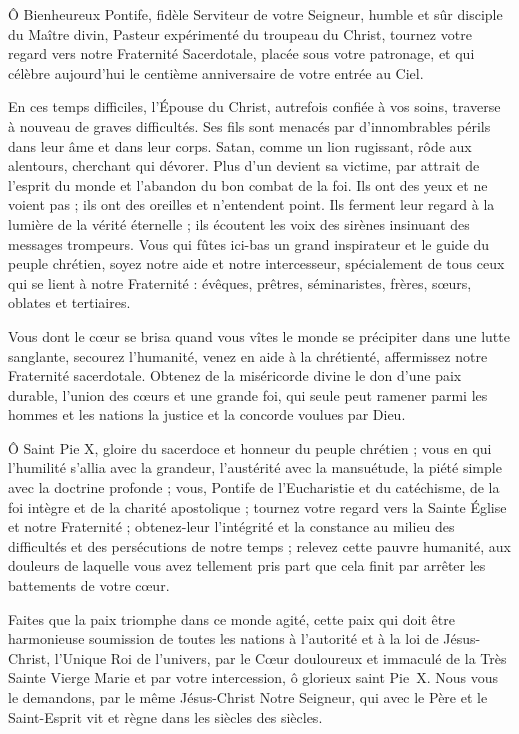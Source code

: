 \documentclass[%
a5paper%
,11pt%
,DIV=15%
,titlepage=on%
,headings=optiontoheadandtoc%
,headings=small%
,parskip=false%
,titlepage%
,openany%
]{scrbook}
\begin{document}
\begin{multicols}{2}
Ô Bienheureux Pontife, fidèle Serviteur de votre Seigneur, humble et sûr disciple du Maître divin, Pasteur expérimenté du troupeau du Christ, tournez votre regard vers notre Fraternité Sacerdotale, placée sous votre patronage, et qui célèbre aujourd'hui le centième anniversaire de votre entrée au Ciel.

En ces temps difficiles, l’Épouse du Christ, autrefois confiée à vos soins, traverse à nouveau de graves difficultés. Ses fils sont menacés par d'innombrables périls dans leur âme et dans leur corps. Satan, comme un lion rugissant, rôde aux alentours, cherchant qui dévorer. Plus d'un devient sa victime, par attrait de l’esprit du monde et l’abandon du bon combat de la foi. Ils ont des yeux et ne voient pas ; ils ont des oreilles et n'entendent point. Ils ferment leur regard à la lumière de la vérité éternelle ; ils écoutent les voix des sirènes insinuant des messages trompeurs. Vous qui fûtes ici-bas un grand inspirateur et le guide du peuple chrétien, soyez notre aide et notre intercesseur, spécialement de tous ceux qui se lient à notre Fraternité : évêques, prêtres, séminaristes, frères, sœurs, oblates et tertiaires.

Vous dont le cœur se brisa quand vous vîtes le monde se précipiter dans une lutte sanglante, secourez l'humanité, venez en aide à la chrétienté, affermissez notre Fraternité sacerdotale. Obtenez de la miséricorde divine le don d'une paix durable, l’union des cœurs et une grande foi, qui seule peut ramener parmi les hommes et les nations la justice et la concorde voulues par Dieu.

Ô Saint Pie X, gloire du sacerdoce et honneur du peuple chrétien ; vous en qui l'humilité s’allia avec la grandeur, l'austérité avec la mansuétude, la piété simple avec la doctrine profonde ; vous, Pontife de l'Eucharistie et du catéchisme, de la foi intègre et de la charité apostolique ; tournez votre regard vers la Sainte Église et notre Fraternité ; obtenez-leur l'intégrité et la constance au milieu des difficultés et des persécutions de notre temps ; relevez cette pauvre humanité, aux douleurs de laquelle vous avez tellement pris part que cela finit par arrêter les battements de votre cœur.

Faites que la paix triomphe dans ce monde agité, cette paix qui doit être harmonieuse soumission de toutes les nations à l'autorité et à la loi de Jésus-Christ, l'Unique Roi de l'univers, par le Cœur douloureux et immaculé de la Très Sainte Vierge Marie et par votre intercession, ô glorieux saint Pie X. Nous vous le demandons, par le même Jésus-Christ Notre Seigneur, qui avec le Père et le Saint-Esprit vit et règne dans les siècles des siècles. 


\end{multicols}
\end{document}
